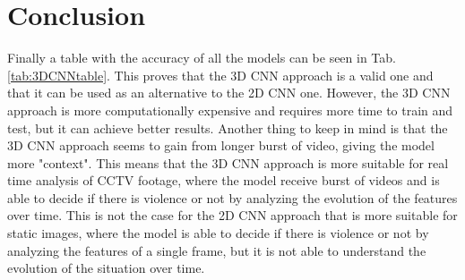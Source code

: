 \chapter{Conclusion}
Finally a table with the accuracy of all the models can be seen in Tab. \ref{tab:3DCNNtable}. This proves that the 3D CNN approach is a valid one and that it can be used as an alternative to the 2D CNN one. However, the 3D CNN approach is more computationally expensive and requires more time to train and test, but it can achieve better results. Another thing to keep in mind is that the 3D CNN approach seems to gain from longer burst of video, giving the model more "context". This means that the 3D CNN approach is more suitable for real time analysis of CCTV footage, where the model receive burst of videos and is able to decide if there is violence or not by analyzing the evolution of the features over time. This is not the case for the 2D CNN approach that is more suitable for static images, where the model is able to decide if there is violence or not by analyzing the features of a single frame, but it is not able to understand the evolution of the situation over time.

\begin{table}[h]
    \centering
    \caption{Models accuracy}
    \label{tab:3DCNNtable}
\end{table}
